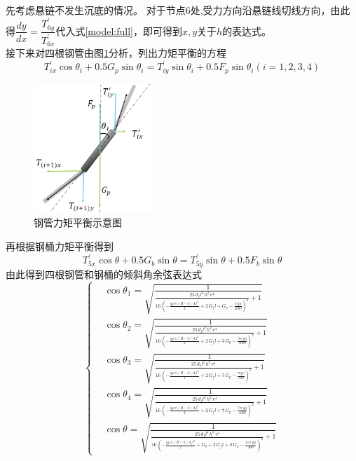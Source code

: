 \documentclass{cumcm}
\begin{document}
先考虑悬链不发生沉底的情况。
对于节点6处,受力方向沿悬链线切线方向，由此得$\dfrac{dy}{dx}=\dfrac{T_{6y}^{'}}{T_{6x}^{'}}$代入式\ref{model:full}，即可得到$x,y$关于$h$的表达式。\\
接下来对四根钢管由图\ref{fig:pipe_m}分析，列出力矩平衡的方程
\begin{displaymath}
	T_{ix}^{'}\cos{\theta_i}+0.5G_p\sin{\theta_i}=T_{iy}^{'}\sin{\theta_i}+0.5F_p\sin{\theta_i}(i=1,2,3,4)
\end{displaymath}
\begin{figure}[H]
	\centering
	\includegraphics*[width=0.4\textwidth]{img/pipe_m.png}
	\caption{钢管力矩平衡示意图}
	\label{fig:pipe_m}
\end{figure}
再根据钢桶力矩平衡得到
\begin{displaymath}
	T_{5x}^{'}\cos{\theta}+0.5G_b\sin{\theta}=T_{5y}^{'}\sin{\theta}+0.5F_b\sin{\theta}
\end{displaymath}
由此得到四根钢管和钢桶的倾斜角余弦表达式
\begin{equation}
\left\{
\begin{aligned}
&\cos{\theta_1}=\sqrt{\frac{1}{\frac{25\, {d_{f}l}^2\, h^2\, v^4}{16\, {\left( - \frac{g\, \mathrm{\rho}\, \pi\, \left(H - h\right)\, {d_{f}l}^2}{2} + 2\, G_{f}l + G_{p} - \frac{\pi\, g\, \mathrm{\rho}}{1600}\right)}^2} + 1}}\\
&\cos{\theta_2}=\sqrt{\frac{1}{\frac{25\, {d_{f}l}^2\, h^2\, v^4}{16\, {\left( - \frac{g\, \mathrm{\rho}\, \pi\, \left(H - h\right)\, {d_{f}l}^2}{2} + 2\, G_{f}l + 3\, G_{p} - \frac{3\, \pi\, g\, \mathrm{\rho}}{1600}\right)}^2} + 1}} \\
&\cos{\theta_3}=\sqrt{\frac{1}{\frac{25\, {d_{f}l}^2\, h^2\, v^4}{16\, {\left( - \frac{g\, \mathrm{\rho}\, \pi\, \left(H - h\right)\, {d_{f}l}^2}{2} + 2\, G_{f}l + 5\, G_{p} - \frac{\pi\, g\, \mathrm{\rho}}{320}\right)}^2} + 1}} \\
&\cos{\theta_4}=\sqrt{\frac{1}{\frac{25\, {d_{f}l}^2\, h^2\, v^4}{16\, {\left( - \frac{g\, \mathrm{\rho}\, \pi\, \left(H - h\right)\, {d_{f}l}^2}{2} + 2\, G_{f}l + 7\, G_{p} - \frac{7\, \pi\, g\, \mathrm{\rho}}{1600}\right)}^2} + 1}}\\
&\cos{\theta}=\sqrt{\frac{1}{\frac{25\, {d_{f}l}^2\, h^2\, v^4}{16\, {\left( - \frac{g\, \mathrm{\rho}\, \pi\, \left(H - h\right)\, {d_{f}l}^2}{2} + G_{b} + 2\, G_{f}l + 8\, G_{p} - \frac{11\, \pi\, g\, \mathrm{\rho}}{400}\right)}^2} + 1}}
\end{aligned}
\right.
\end{equation}
\end{document}
